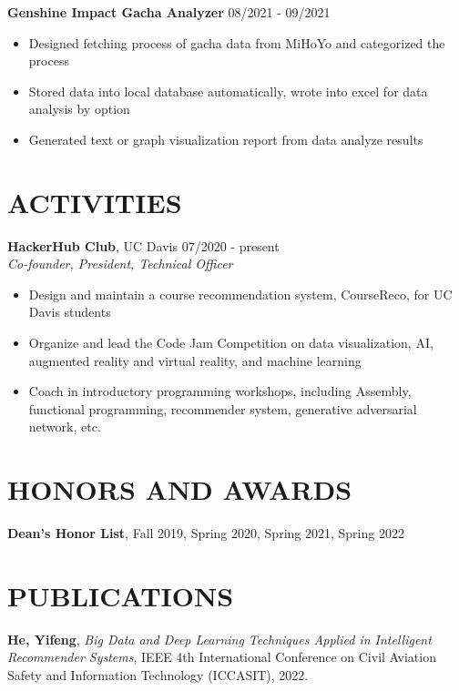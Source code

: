 \documentclass[margin,line]{res}
\begin{document}
\begin{resume}
\textbf{Genshine Impact Gacha Analyzer} \hfill {08/2021 - 09/2021} \\
\begin{itemize}
	\item Designed fetching process of gacha data from MiHoYo and categorized the process 
	\item Stored data into local database automatically, wrote into excel for data analysis by option
	\item Generated text or graph visualization report from data analyze results
\end{itemize}

\section{\sc ACTIVITIES}
\textbf{HackerHub Club}, UC Davis \hfill {07/2020 - present} \\
\textit{Co-founder, President, Technical Officer}
\begin{itemize}
	\item Design and maintain a course recommendation system, CourseReco, for UC Davis students 
	\item Organize and lead the Code Jam Competition on data visualization, AI, augmented reality and virtual reality, and machine learning 
	\item Coach in introductory programming workshops, including Assembly, functional programming, recommender system, generative adversarial network, etc. 
\end{itemize}

\section{\sc HONORS AND AWARDS} 
\textbf{Dean's Honor List}, Fall 2019, Spring 2020, Spring 2021, Spring 2022
\vspace{0.5cm}

\section{\sc PUBLICATIONS}
\textbf{He, Yifeng}, \textit{Big Data and Deep Learning Techniques Applied in Intelligent Recommender Systems}, 
IEEE 4th International Conference on Civil Aviation Safety and Information Technology (ICCASIT), 2022.



\end{resume}
\end{document}
